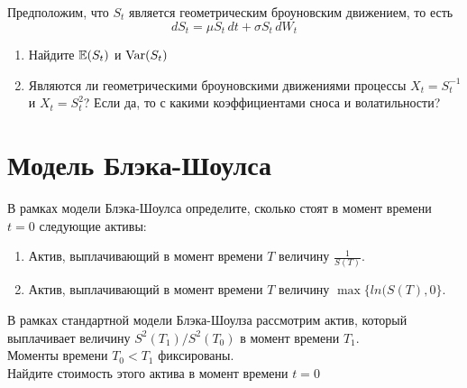 \begin{problem}
Предположим, что $S_t$ является геометрическим броуновским движением, то есть
\[
dS_t = \mu S_t \, dt + \sigma S_t \, dW_t
\]


\begin{enumerate}
\item Найдите $\mathbb{E}(S_t)$ и $\operatorname{Var}(S_t)$
\item Являются ли геометрическими броуновскими движениями процессы $X_t=S_t^{-1}$ и $X_t=S_t^{2}$? Если да, то с какими коэффициентами сноса и волатильности?
\end{enumerate}


\begin{sol}

\end{sol}
\end{problem}


\section{Модель Блэка-Шоулса}


\begin{problem}
В рамках модели Блэка-Шоулса определите, сколько стоят в момент времени $t=0$ следующие активы:
\begin{enumerate}
\item Актив, выплачивающий в момент времени $T$ величину $\frac{1}{S(T)}$.
\item Актив, выплачивающий в момент времени $T$ величину $\max\{ln(S(T),0\}$.
\end{enumerate}

\begin{sol}

\end{sol}
\end{problem}

\begin{problem}
В рамках стандартной модели Блэка-Шоулза рассмотрим актив, который выплачивает величину $S^{2}(T_{1})/S^{2}(T_{0})$ в момент времени $T_{1}$. \\
Моменты времени $T_{0}<T_{1}$ фиксированы. \\
Найдите стоимость этого актива в момент времени $t=0$

\begin{sol}

\end{sol}
\end{problem}

